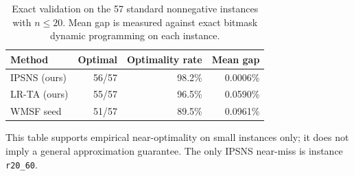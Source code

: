 \begin{table}[t]
\centering
\caption{Exact validation on the 57 standard nonnegative instances with $n \le 20$. Mean gap is measured against exact bitmask dynamic programming on each instance.}
\label{tab:exact-validation}
\begin{tabular}{lrrr}
\toprule
Method & Optimal & Optimality rate & Mean gap \\
\midrule
IPSNS (ours) & 56/57 & 98.2\% & 0.0006\% \\
LR-TA (ours) & 55/57 & 96.5\% & 0.0590\% \\
WMSF seed & 51/57 & 89.5\% & 0.0961\% \\
\bottomrule
\end{tabular}
\par\vspace{2pt}\parbox{0.94\linewidth}{\footnotesize This table supports empirical near-optimality on small instances only; it does not imply a general approximation guarantee. The only IPSNS near-miss is instance \texttt{r20\_60}.}
\end{table}
